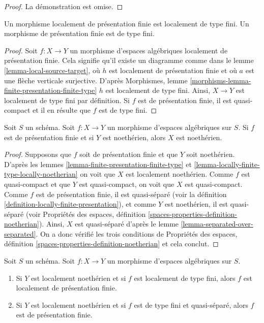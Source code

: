 \begin{proof}
La démonstration est omise.
\end{proof}

\begin{lemma}
\label{lemma-finite-presentation-finite-type}
Un morphisme localement de présentation finie est localement de type fini.
Un morphisme de présentation finie est de type fini.
\end{lemma}

\begin{proof}
Soit $f : X \to Y$ un morphisme d'espaces algébriques localement de
présentation finie. Cela signifie qu'il existe un diagramme comme dans le
lemme \ref{lemma-local-source-target},
où $h$ est localement de présentation finie et où $a$ est une flèche verticale surjective. D'après
Morphismes, lemme \ref{morphisms-lemma-finite-presentation-finite-type}
$h$ est localement de type fini.
Ainsi, $X \to Y$ est localement de type fini par définition.
Si $f$ est de présentation finie, il est quasi-compact et
il en résulte que $f$ est de type fini.
\end{proof}

\begin{lemma}
\label{lemma-finite-presentation-noetherian}
Soit $S$ un schéma.
Soit $f : X \to Y$ un morphisme d'espaces algébriques sur $S$.
Si $f$ est de présentation finie et si $Y$ est noethérien,
alors $X$ est noethérien.
\end{lemma}

\begin{proof}
Supposons que $f$ soit de présentation finie et que $Y$ soit noethérien. D'après les
lemmes \ref{lemma-finite-presentation-finite-type} et
\ref{lemma-locally-finite-type-locally-noetherian}
on voit que $X$ est localement noethérien. Comme $f$ est quasi-compact
et que $Y$ est quasi-compact, on voit que $X$ est quasi-compact.
Comme $f$ est de présentation finie, il est quasi-séparé (voir la
définition \ref{definition-locally-finite-presentation}),
et comme $Y$ est noethérien, il est quasi-séparé (voir
Propriétés des espaces,
définition \ref{spaces-properties-definition-noetherian}).
Ainsi, $X$ est quasi-séparé d'après le
lemme \ref{lemma-separated-over-separated}.
On a donc vérifié les trois conditions de
Propriétés des espaces,
définition \ref{spaces-properties-definition-noetherian}
et cela conclut.
\end{proof}

\begin{lemma}
\label{lemma-noetherian-finite-type-finite-presentation}
Soit $S$ un schéma.
Soit $f : X \to Y$ un morphisme d'espaces algébriques sur $S$.
\begin{enumerate}
\item Si $Y$ est localement noethérien et si $f$ est localement de type fini,
alors $f$ est localement de présentation finie.
\item Si $Y$ est localement noethérien et si $f$ est de type fini et quasi-séparé,
alors $f$ est de présentation finie.
\end{enumerate}
\end{lemma}

